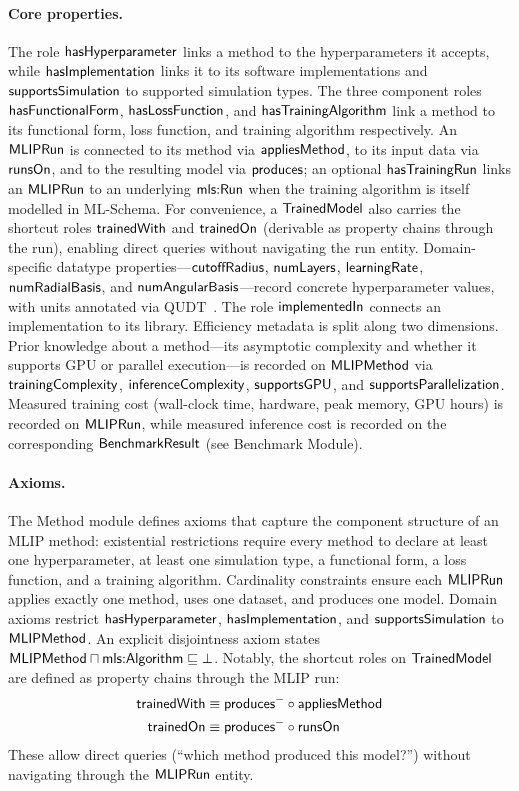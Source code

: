 \paragraph{Core properties.}
The role $\mathsf{hasHyperparameter}$ links a method to the hyperparameters
it accepts, while $\mathsf{hasImplementation}$ links it to its software
implementations and $\mathsf{supportsSimulation}$ to supported simulation
types. The three component roles $\mathsf{hasFunctionalForm}$,
$\mathsf{hasLossFunction}$, and $\mathsf{hasTrainingAlgorithm}$ link a method to
its functional form, loss function, and training algorithm
respectively. An $\mathsf{MLIPRun}$ is connected to its method via
$\mathsf{appliesMethod}$, to its input data via $\mathsf{runsOn}$, and to the
resulting model via $\mathsf{produces}$; an optional $\mathsf{hasTrainingRun}$
links an $\mathsf{MLIPRun}$ to an underlying $\mathsf{mls{:}Run}$ when the training
algorithm is itself modelled in ML-Schema. For convenience, a
$\mathsf{TrainedModel}$ also carries the shortcut roles $\mathsf{trainedWith}$ and
$\mathsf{trainedOn}$ (derivable as property chains through the run),
enabling direct queries without navigating the run entity.
Domain-specific datatype properties---$\mathsf{cutoffRadius}$, $\mathsf{numLayers}$,
$\mathsf{learningRate}$, $\mathsf{numRadialBasis}$, and $\mathsf{numAngularBasis}$---record
concrete hyperparameter values, with units annotated via
QUDT~\cite{hodgson2014qudt}. The role $\mathsf{implementedIn}$ connects an
implementation to its library. Efficiency metadata is split along two
dimensions. Prior knowledge about a method---its asymptotic complexity
and whether it supports GPU or parallel execution---is recorded on
$\mathsf{MLIPMethod}$ via $\mathsf{trainingComplexity}$,
$\mathsf{inferenceComplexity}$, $\mathsf{supportsGPU}$, and
$\mathsf{supportsParallelization}$. Measured training cost
(wall-clock time, hardware, peak memory, GPU hours) is recorded on
$\mathsf{MLIPRun}$, while measured inference cost is recorded on the
corresponding $\mathsf{BenchmarkResult}$ (see Benchmark Module).

\paragraph{Axioms.}
The Method module defines axioms that capture the component structure
of an MLIP method: existential restrictions require every method to
declare at least one hyperparameter, at least one simulation type, a
functional form, a loss function, and a training algorithm.
Cardinality constraints ensure each $\mathsf{MLIPRun}$ applies exactly one
method, uses one dataset, and produces one model. Domain axioms
restrict $\mathsf{hasHyperparameter}$, $\mathsf{hasImplementation}$, and
$\mathsf{supportsSimulation}$ to $\mathsf{MLIPMethod}$. An explicit disjointness
axiom states $\mathsf{MLIPMethod} \sqcap \mathsf{mls{:}Algorithm} \sqsubseteq \bot$.
Notably, the shortcut roles on $\mathsf{TrainedModel}$ are defined as
property chains through the MLIP run:
%
\begin{align*}
  \mathsf{trainedWith} &\equiv \mathsf{produces}^{-} \circ \mathsf{appliesMethod} \\
  \mathsf{trainedOn} &\equiv \mathsf{produces}^{-} \circ \mathsf{runsOn}
\end{align*}
%
These allow direct queries (``which method produced this model?'')
without navigating through the $\mathsf{MLIPRun}$ entity.



